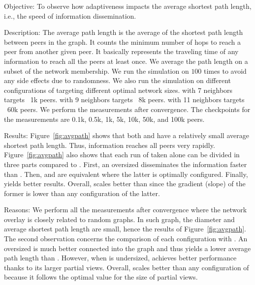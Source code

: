 \begin{asparadesc}
\item[Objective:] To observe how adaptiveness impacts the average shortest path
  length, i.e., the speed of information dissemination.
\item[Description:] The average path length is the average of the
  shortest path length between peers in the graph. It counts the
  minimum number of hops to reach a peer from another given peer. It
  basically represents the traveling time of any information to reach
  all the peers at least once. We average the path length on a subset
  of the network membership. We run the simulation on \SPRAY $100$
  times to avoid any side effects due to randomness. We also run the
  simulation on different configurations of \CYCLON targeting
  different optimal network sizes. \CYCLON with 7 neighbors targets ~1k
  peers. \CYCLON with 9 neighbors targets ~8k peers. \CYCLON with 11
  neighbors targets ~60k peers. We perform the measurements after
  convergence. The checkpoints for the measurements are 0.1k, 0.5k,
  1k, 5k, 10k, 50k, and 100k peers.
\item[Results:] Figure~\ref{fig:avgpath} shows that both \CYCLON and
  \SPRAY have a relatively small average shortest path length. Thus,
  information reaches all peers very rapidly. Figure~\ref{fig:avgpath}
  also shows that each run of \CYCLON taken alone can be divided in
  three parts compared to \SPRAY. First, an oversized \CYCLON
  disseminates the information faster than \SPRAY. Then, \SPRAY and
  \CYCLON are equivalent where the latter is optimally
  configured. Finally, \SPRAY yields better results. Overall, \SPRAY
  scales better than \CYCLON since the gradient (slope) of the former is lower
  than any configuration of the latter.
\item[Reasons:] We perform all the measurements after convergence
  where the network overlay is closely related to random graphs. In
  such graph, the diameter and average shortest path length are small,
  hence the results of Figure~\ref{fig:avgpath}. The second
  observation concerns the comparison of each \CYCLON configuration
  with \SPRAY.  An oversized \CYCLON is much better connected into the
  graph and thus yields a lower average path length than
  \SPRAY. However, when \CYCLON is undersized, \SPRAY achieves better
  performance thanks to its larger partial views. Overall, \SPRAY
  scales better than any configuration of \CYCLON because it follows
  the optimal value for the size of partial views.
\end{asparadesc}


